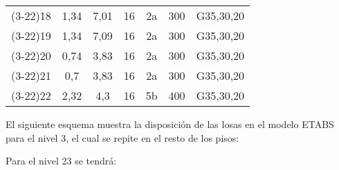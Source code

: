 \begin{table}[H]
\begin{tabular}{ccccccc}
    (3-22)18 &      1,34 &      7,01 &      16 &      2a &      300 &      G35,30,20      \\
    (3-22)19 &      1,34 &      7,09 &      16 &      2a &      300 &      G35,30,20      \\
    (3-22)20 &      0,74 &      3,83 &      16 &      2a &      300 &      G35,30,20      \\
    (3-22)21 &      0,7 &      3,83 &      16 &      2a &      300 &      G35,30,20      \\
    (3-22)22 &      2,32 &      4,3 &      16 &      5b &      400 &      G35,30,20      \bigstrut[b]\\
    \hline
  \end{tabular}
  \label{losas322}
\end{table}

\newpage

El siguiente esquema muestra la disposición de las losas en el modelo ETABS para el nivel 3, el cual se repite en el resto de los pisos:


\newpage

Para el nivel 23 se tendrá:

